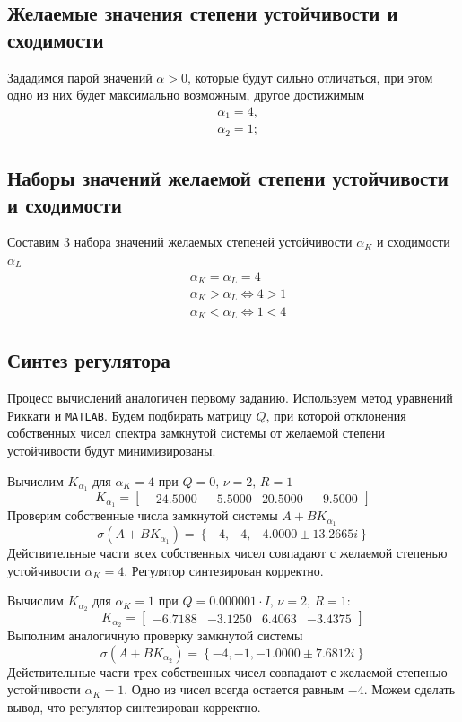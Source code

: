 \documentclass[a4paper, 12pt]{article}
\begin{document}
    \subsection{Желаемые значения степени устойчивости и сходимости}
    Зададимся парой значений $\alpha>0$, которые будут сильно отличаться, при этом
    одно из них будет максимально возможным, другое достижимым
    \begin{align*}
        &\alpha_1=4,\\
        &\alpha_2=1;
    \end{align*}


    \subsection{Наборы значений желаемой степени устойчивости и сходимости}
    Составим 3 набора значений желаемых степеней устойчивости $\alpha_K$ и сходимости $\alpha_L$
    \begin{align*}
        &\alpha_K=\alpha_L=4\\
        &\alpha_K>\alpha_L\Leftrightarrow 4>1\\
        &\alpha_K<\alpha_L\Leftrightarrow 1<4
    \end{align*}


    \subsection{Синтез регулятора}
    Процесс вычислений аналогичен первому заданию. Используем метод уравнений Риккати и \texttt{MATLAB}.
    Будем подбирать матрицу $Q$, при которой отклонения собственных чисел спектра замкнутой системы
    от желаемой степени устойчивости будут минимизированы.


    Вычислим $K_{\alpha_1}$ для $\alpha_K=4$ при $Q=0,\,\nu=2,\,R=1$
    $$
    K_{\alpha_1}=
    \begin{bmatrix}
        -24.5000   &-5.5000   &20.5000   &-9.5000
    \end{bmatrix}
    $$
    Проверим собственные числа замкнутой системы $A+BK_{\alpha_1}$
    $$
    \sigma\left( A+BK_{\alpha_1} \right)=\left\{ -4,-4,-4.0000\pm13.2665i \right\}
    $$
    Действительные части всех собственных чисел совпадают с желаемой степенью устойчивости $\alpha_K=4$.
    Регулятор синтезирован корректно.


    Вычислим $K_{\alpha_2}$ для $\alpha_K=1$ при $Q=0.000001\cdot I,\,\nu=2,\,R=1$:
    $$
    K_{\alpha_2}=
    \begin{bmatrix}
        -6.7188   &-3.1250    &6.4063   &-3.4375
    \end{bmatrix}
    $$
    Выполним аналогичную проверку замкнутой системы
    $$
    \sigma\left( A+BK_{\alpha_2} \right)=\left\{ -4,-1,-1.0000 \pm 7.6812i \right\}
    $$
    Действительные части трех собственных чисел совпадают с желаемой степенью устойчивости $\alpha_K=1$.
    Одно из чисел всегда остается равным $-4$. Можем сделать вывод, что регулятор синтезирован корректно.
\end{document}

